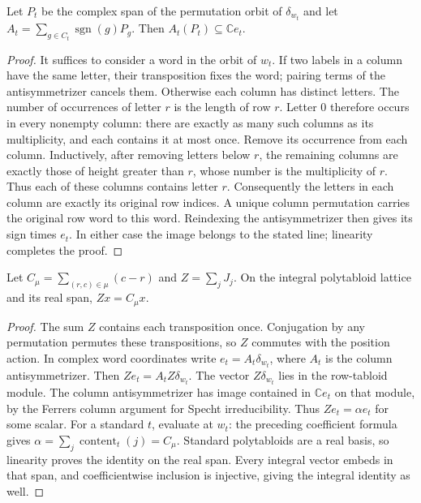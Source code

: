 \begin{lemma}
\label{lem:column-antisymmetrizer-line}
\leanok
Let $P_t$ be the complex span of the permutation orbit of
$\delta_{w_t}$ and let $A_t=\sum_{g\in C_t}\operatorname{sgn}(g)P_g$.
Then $A_t(P_t)\subseteq\mathbb C e_t$.
\end{lemma}
\begin{proof}
It suffices to consider a word in the orbit of $w_t$. If two labels
in a column have the same letter, their transposition fixes the word;
pairing terms of the antisymmetrizer cancels them. Otherwise each
column has distinct letters. The number of occurrences of letter $r$
is the length of row $r$. Letter $0$ therefore occurs in every nonempty
column: there are exactly as many such columns as its multiplicity,
and each contains it at most once. Remove its occurrence from each
column. Inductively, after removing letters below $r$, the remaining
columns are exactly those of height greater than $r$, whose number is
the multiplicity of $r$. Thus each of these columns contains letter
$r$. Consequently the letters in each column are exactly its original
row indices. A unique column permutation carries the original row
word to this word. Reindexing the antisymmetrizer then gives its sign
times $e_t$. In either case the image belongs to the stated line;
linearity completes the proof.
\end{proof}

\begin{lemma}
\label{lem:central-content-action}
\leanok
{}
Let $C_\mu=\sum_{(r,c)\in\mu}(c-r)$ and $Z=\sum_jJ_j$.
On the integral polytabloid lattice and its real span, $Zx=C_\mu x$.
\end{lemma}
\begin{proof}
The sum $Z$ contains each transposition once. Conjugation by any
permutation permutes these transpositions, so $Z$ commutes with the
position action. In complex word coordinates write
$e_t=A_t\delta_{w_t}$, where $A_t$ is the column antisymmetrizer.
Then $Ze_t=A_tZ\delta_{w_t}$. The vector $Z\delta_{w_t}$ lies in
the row-tabloid module. The column antisymmetrizer has image contained
in $\mathbb C e_t$ on that module, by the Ferrers column argument
for Specht irreducibility. Thus $Ze_t=\alpha e_t$ for some scalar.
For a standard $t$, evaluate at $w_t$: the preceding coefficient
formula gives $\alpha=\sum_j\operatorname{content}_t(j)=C_\mu$.
Standard polytabloids are a real basis, so linearity proves the
identity on the real span. Every integral vector embeds in that
span, and coefficientwise inclusion is injective, giving the
integral identity as well.
\end{proof}

